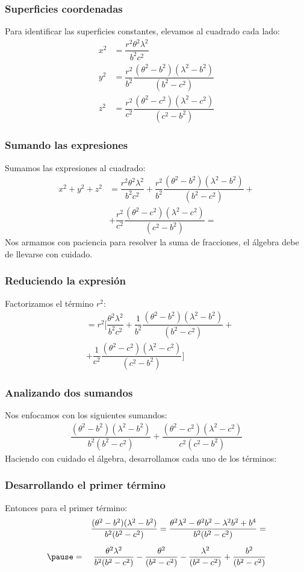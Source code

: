 \documentclass[12pt]{beamer}
\begin{document}
\begin{frame}
\frametitle{Superficies coordenadas}
Para identificar las superficies constantes, elevamos al cuadrado cada lado:
\pause
\begin{align*}
x^{2} &= \dfrac{r^{2} \theta^{2} \lambda^{2}}{b^{2} c^{2}} \\[0.5em]
y^{2} &= \dfrac{r^{2}}{b^{2}} \dfrac{(\theta^{2} - b^{2})(\lambda^{2} - b^{2})}{(b^{2} - c^{2})} \\[0.5em]
z^{2} &= \dfrac{r^{2}}{c^{2}} \dfrac{(\theta^{2} - c^{2})(\lambda^{2} - c^{2})}{(c^{2} - b^{2})}
\end{align*}
\end{frame}
\begin{frame}
\frametitle{Sumando las expresiones}
Sumamos las expresiones al cuadrado:
\begin{align*}
x^{2} + y^{2} + z^{2} &= \dfrac{r^{2} \theta^{2} \lambda^{2}}{b^{2} c^{2}} + \dfrac{r^{2}}{b^{2}} \dfrac{(\theta^{2} - b^{2})(\lambda^{2} - b^{2})}{(b^{2} - c^{2})} + \\[0.5em]
&+ \dfrac{r^{2}}{c^{2}} \dfrac{(\theta^{2} - c^{2})(\lambda^{2} - c^{2})}{(c^{2} - b^{2})} =
\end{align*}
\pause
Nos armamos con paciencia para resolver la suma de fracciones, el álgebra debe de llevarse con cuidado.
\end{frame}
\begin{frame}
\frametitle{Reduciendo la expresión}
Factorizamos el término $r^{2}$:
\pause
\begin{align*}
&= r^{2} \bigg[ \dfrac{\theta^{2} \lambda^{2}}{b^{2} c^{2}} + \dfrac{1}{b^{2}} \dfrac{(\theta^{2} - b^{2})(\lambda^{2} - b^{2})}{(b^{2} - c^{2})} + \\[0.5em]
&+ \dfrac{1}{c^{2}} \dfrac{(\theta^{2} - c^{2})(\lambda^{2} - c^{2})}{(c^{2} - b^{2})} \bigg]
\end{align*}
\end{frame}
\begin{frame}
\frametitle{Analizando dos sumandos}
Nos enfocamos con los siguientes sumandos:
\pause
\begin{align*}
\dfrac{(\theta^{2} - b^{2})(\lambda^{2} - b^{2})}{b^{2}(b^{2} - c^{2})} + \dfrac{(\theta^{2} - c^{2})(\lambda^{2} - c^{2})}{c^{2}(c^{2} - b^{2})}
\end{align*}
\pause
Haciendo con cuidado el álgebra, desarrollamos cada uno de los términos:
\end{frame}
\begin{frame}
\frametitle{Desarrollando el primer término}
Entonces para el primer término:
\pause
\begin{eqnarray*}
&{}&\dfrac{(\theta^{2} - b^{2})(\lambda^{2} - b^{2})}{b^{2}(b^{2} - c^{2})} = \dfrac{\theta^{2} \lambda^{2} - \theta^2 b^{2} - \lambda^{2} b^{2} + b^{4}}{b^{2}(b^{2} - c^{2})} = \\[0.5em] \pause
&=& \dfrac{\theta^{2} \lambda^{2}}{b^{2}(b^{2} - c^{2})} - \dfrac{\theta^{2}}{(b^{2} - c^{2})} - \dfrac{\lambda^{2}}{(b^{2} - c^{2})} + \dfrac{b^{2}}{(b^{2} - c^{2})}
\end{eqnarray*}
\end{frame}
\end{document}
